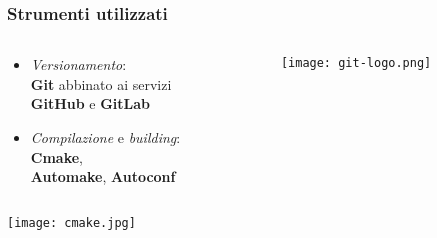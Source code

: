 \begin{frame}
  \frametitle{Strumenti utilizzati}
  \begin{columns}
    \begin{column}{0.4\textwidth}
      \begin{itemize}
        \item \textit{Versionamento}: \\ \textbf{Git} 
              abbinato ai servizi \\ \textbf{GitHub} e \textbf{GitLab}
        \item \textit{Compilazione} e \textit{building}: \\
              \textbf{Cmake}, \\ \textbf{Automake}, \textbf{Autoconf}
      \end{itemize}
    \end{column}
    \begin{column}{0.6\textwidth}
      \texttt{[image: git-logo.png]}
    \end{column}	
  \end{columns}
  \begin{flushleft}
      \texttt{[image: cmake.jpg]}
  \end{flushleft}

\end{frame}


